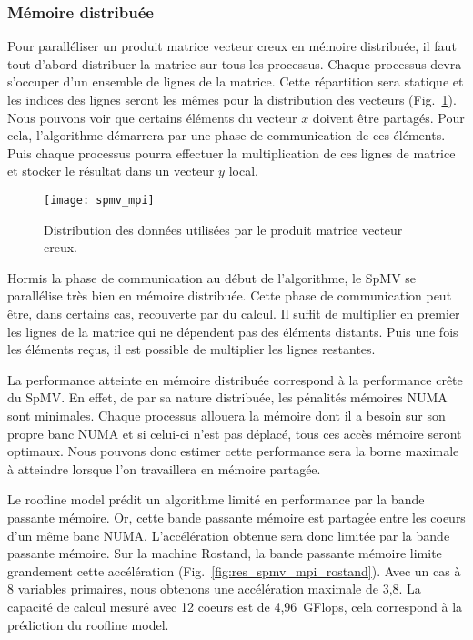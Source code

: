 \subsubsection{Mémoire distribuée}
Pour paralléliser un produit matrice vecteur creux en mémoire distribuée, il faut tout d'abord distribuer la matrice sur tous les processus.
%
Chaque processus devra s'occuper d'un ensemble de lignes de la matrice.
%
Cette répartition sera statique et les indices des lignes seront les mêmes pour la distribution des vecteurs (Fig.~\ref{fig:spmv_mpi}).
%
Nous pouvons voir que certains éléments du vecteur $x$ doivent être partagés.
%
Pour cela, l'algorithme démarrera par une phase de communication de ces éléments.
%
Puis chaque processus pourra effectuer la multiplication de ces lignes de matrice et stocker le résultat dans un vecteur $y$ local.
\begin{figure}
  \centering
  \texttt{[image: spmv\_mpi]}
  \caption{Distribution des données utilisées par le produit matrice vecteur creux.}
  \label{fig:spmv_mpi}
\end{figure}
Hormis la phase de communication au début de l'algorithme, le SpMV se parallélise très bien en mémoire distribuée.
%
Cette phase de communication peut être, dans certains cas, recouverte par du calcul.
%
Il suffit de multiplier en premier les lignes de la matrice qui ne dépendent pas des éléments distants.
%
Puis une fois les éléments reçus, il est possible de multiplier les lignes restantes.

La performance atteinte en mémoire distribuée correspond à la performance crête du SpMV.
%
En effet, de par sa nature distribuée, les pénalités mémoires NUMA sont minimales.
%
Chaque processus allouera la mémoire dont il a besoin sur son propre banc NUMA et si celui-ci n'est pas déplacé, tous ces accès mémoire seront optimaux.
%
Nous pouvons donc estimer cette performance sera la borne maximale à atteindre lorsque l'on travaillera en mémoire partagée.


Le roofline model prédit un algorithme limité en performance par la bande passante mémoire.
%
Or, cette bande passante mémoire est partagée entre les coeurs d'un même banc NUMA.
%
L'accélération obtenue sera donc limitée par la bande passante mémoire.
%
Sur la machine Rostand, la bande passante mémoire limite grandement cette accélération (Fig.~\ref{fig:res_spmv_mpi_rostand}).
%
Avec un cas à 8 variables primaires, nous obtenons une accélération maximale de 3,8.
%
La capacité de calcul mesuré avec 12 coeurs est de 4,96~GFlops, cela correspond à la prédiction du roofline model.

